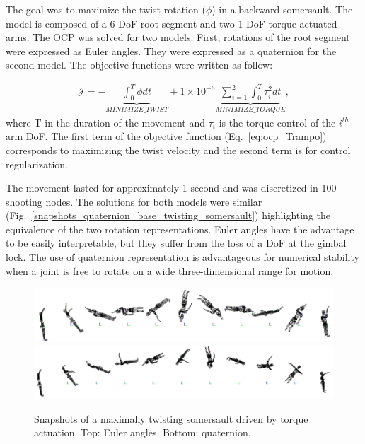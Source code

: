 The goal was to maximize the twist rotation ($\phi$) in a backward somersault.
The model is composed of a 6-DoF root segment and two 1-DoF torque actuated arms.
The OCP was solved for two models.
First, rotations of the root segment were expressed as Euler angles.
They were expressed as a quaternion for the second model.
The objective functions were written as follow:

\begin{eqnarray}\label{eq:ocp_Trampo}
\mathcal{J} = -\underbrace{\int_0^T \dot{\phi} dt}_{MINIMIZE\_TWIST}  +  1\times 10^{-6} \underbrace{\sum_{i=1}^{2}\int_0^T \tau_{i}^2 dt}_{MINIMIZE\_ TORQUE},
\end{eqnarray}
where T in the duration of the movement and $\tau_{i}$ is the torque control of the $i^{th}$ arm DoF.
The first term of the objective function (Eq.~\ref{eq:ocp_Trampo}) corresponds to maximizing the twist velocity and the second term is for control regularization.


The movement lasted for approximately 1 second and was discretized in 100 shooting nodes.
The solutions for both models were similar (Fig.~\ref{snapshots_quaternion_base_twisting_somersault}) highlighting the equivalence of the two rotation representations.
Euler angles have the advantage to be easily interpretable, but they suffer from the loss of a DoF at the gimbal lock.
The use of quaternion representation is advantageous for numerical stability when a joint is free to rotate on a wide three-dimensional range for motion.


\begin{figure}[t!]
\centering
\includegraphics[width=\textwidth]{figures/Euler_Bioptim_MaxVrille_2.png}\\
\vspace*{0.5em}
\includegraphics[width=\textwidth]{figures/Quat_Bioptim_MaxVrille_2.png}
\caption{Snapshots of a maximally twisting somersault driven by torque actuation. Top: Euler angles. Bottom: quaternion.}
\label{fig:snapshots_quaternion_base_twisting_somersault}
\end{figure}


